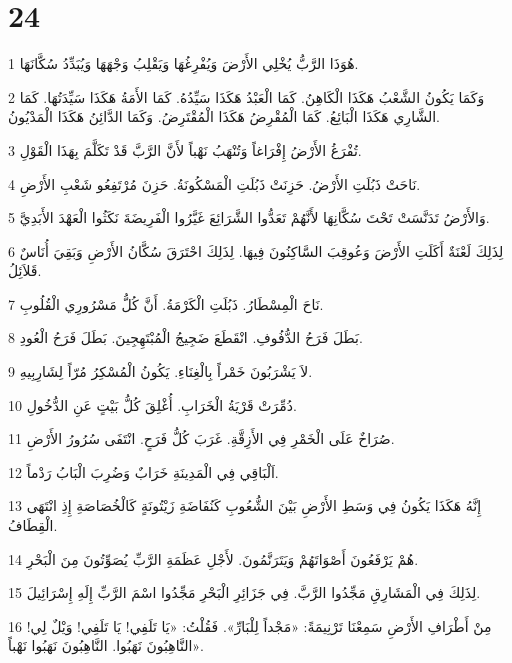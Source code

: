 \chapter{24}

\par 1 هُوَذَا الرَّبُّ يُخْلِي الأَرْضَ وَيُفْرِغُهَا وَيَقْلِبُ وَجْهَهَا وَيُبَدِّدُ سُكَّانَهَا.
\par 2 وَكَمَا يَكُونُ الشَّعْبُ هَكَذَا الْكَاهِنُ. كَمَا الْعَبْدُ هَكَذَا سَيِّدُهُ. كَمَا الأَمَةُ هَكَذَا سَيِّدَتُهَا. كَمَا الشَّارِي هَكَذَا الْبَائِعُ. كَمَا الْمُقْرِضُ هَكَذَا الْمُقْتَرِضُ. وَكَمَا الدَّائِنُ هَكَذَا الْمَدْيُونُ.
\par 3 تُفْرَغُ الأَرْضُ إِفْرَاغاً وَتُنْهَبُ نَهْباً لأَنَّ الرَّبَّ قَدْ تَكَلَّمَ بِهَذَا الْقَوْلِ.
\par 4 نَاحَتْ ذَبُلَتِ الأَرْضُ. حَزِنَتْ ذَبُلَتِ الْمَسْكُونَةُ. حَزِنَ مُرْتَفِعُو شَعْبِ الأَرْضِ.
\par 5 وَالأَرْضُ تَدَنَّسَتْ تَحْتَ سُكَّانِهَا لأَنَّهُمْ تَعَدُّوا الشَّرَائِعَ غَيَّرُوا الْفَرِيضَةَ نَكَثُوا الْعَهْدَ الأَبَدِيَّ.
\par 6 لِذَلِكَ لَعْنَةٌ أَكَلَتِ الأَرْضَ وَعُوقِبَ السَّاكِنُونَ فِيهَا. لِذَلِكَ احْتَرَقَ سُكَّانُ الأَرْضِ وَبَقِيَ أُنَاسٌ قَلاَئِلُ.
\par 7 نَاحَ الْمِسْطَارُ. ذَبُلَتِ الْكَرْمَةُ. أَنَّ كُلُّ مَسْرُورِي الْقُلُوبِ.
\par 8 بَطَلَ فَرَحُ الدُّفُوفِ. انْقَطَعَ ضَجِيجُ الْمُبْتَهِجِينَ. بَطَلَ فَرَحُ الْعُودِ.
\par 9 لاَ يَشْرَبُونَ خَمْراً بِالْغِنَاءِ. يَكُونُ الْمُسْكِرُ مُرّاً لِشَارِبِيهِ.
\par 10 دُمِّرَتْ قَرْيَةُ الْخَرَابِ. أُغْلِقَ كُلُّ بَيْتٍ عَنِ الدُّخُولِ.
\par 11 صُرَاخٌ عَلَى الْخَمْرِ فِي الأَزِقَّةِ. غَرَبَ كُلُّ فَرَحٍ. انْتَفَى سُرُورُ الأَرْضِ.
\par 12 اَلْبَاقِي فِي الْمَدِينَةِ خَرَابٌ وَضُرِبَ الْبَابُ رَدْماً.
\par 13 إِنَّهُ هَكَذَا يَكُونُ فِي وَسَطِ الأَرْضِ بَيْنَ الشُّعُوبِ كَنُفَاضَةِ زَيْتُونَةٍ كَالْخُصَاصَةِ إِذِ انْتَهَى الْقِطَافُ.
\par 14 هُمْ يَرْفَعُونَ أَصْوَاتَهُمْ وَيَتَرَنَّمُونَ. لأَجْلِ عَظَمَةِ الرَّبِّ يُصَوِّتُونَ مِنَ الْبَحْرِ.
\par 15 لِذَلِكَ فِي الْمَشَارِقِ مَجِّدُوا الرَّبَّ. فِي جَزَائِرِ الْبَحْرِ مَجِّدُوا اسْمَ الرَّبِّ إِلَهِ إِسْرَائِيلَ.
\par 16 مِنْ أَطْرَافِ الأَرْضِ سَمِعْنَا تَرْنِيمَةً: «مَجْداً لِلْبَارِّ». فَقُلْتُ: «يَا تَلَفِي! يَا تَلَفِي! وَيْلٌ لِي! النَّاهِبُونَ نَهَبُوا. النَّاهِبُونَ نَهَبُوا نَهْباً».
